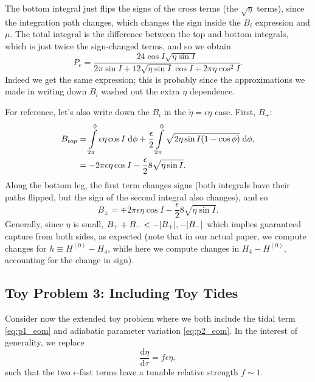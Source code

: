 \documentclass[11pt,
        usenames, %
        dvipsnames %
    ]{article}
\newcommand*{\rd}[2]{\frac{\mathrm{d}#1}{\mathrm{d}#2}}
\DeclarePairedDelimiter\abs{\lvert}{\rvert}
\DeclarePairedDelimiter\p{\lparen}{\rparen}
\begin{document}
The bottom integral just flips the signs of the cross terms (the $\sqrt{\eta}$
terms), since the integration path changes, which changes the sign inside the
$B_i$ expression and $\mu$. The total integral is the difference between the top
and bottom integrals, which is just twice the sign-changed terms, and so we
obtain
\begin{equation}
    P_c = \frac{24\cos I \sqrt{\eta \sin I}}{
            2\pi \sin I + 12\sqrt{\eta \sin I}\cos I + 2\pi \eta \cos^2 I}.
\end{equation}
Indeed we get the same expression; this is probably since the approximations we
made in writing down $B_i$ washed out the extra $\eta$ dependence.

For reference, let's also write down the $B_i$ in the $\dot{\eta} = \epsilon
\eta$ case. First, $B_{+}$:
\begin{align*}
    B_{top} &= \int\limits_{2\pi}^0 \epsilon \eta \cos I\;\mathrm{d}\phi
            + \frac{\epsilon}{2}\int\limits_{2\pi}^0
                \sqrt{2\eta \sin I\p*{1 - \cos \phi}}\;\mathrm{d}\phi,\\
        &= -2\pi \epsilon \eta \cos I - \frac{\epsilon}{2}8\sqrt{\eta \sin I}.
\end{align*}
Along the bottom leg, the first term changes signs (both integrals have their
paths flipped, but the sign of the second integral also changes), and so
\begin{equation}
    B_{\pm} = \mp 2\pi \epsilon \eta \cos I
        - \frac{\epsilon}{2}8\sqrt{\eta \sin I}.
\end{equation}
Generally, since $\eta$ is small, $B_{+} + B_- < -\abs*{B_+}, -\abs*{B_-}$ which
implies guaranteed capture from both sides, as expected (note that in our actual
paper, we compute changes for $h \equiv H^{(0)} - H_4$, while here we compute
changes in $H_4 - H^{(0)}$, accounting for the change in sign).

\subsection{Toy Problem 3: Including Toy Tides}

Consider now the extended toy problem where we both include the tidal term
\autoref{eq:p1_eom} and adiabatic parameter variation \autoref{eq:p2_eom}. In
the interest of generality, we replace
\begin{equation}
    \rd{\eta}{\tau} = f \epsilon \eta,
\end{equation}
such that the two $\epsilon$-fast terms have a tunable relative strength
$f \sim 1$.
\end{document}
